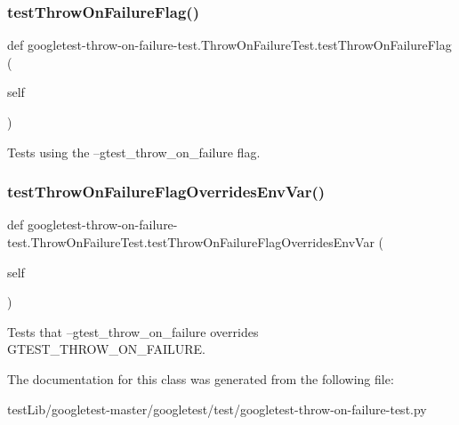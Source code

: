 \subsubsection{\texorpdfstring{test\+Throw\+On\+Failure\+Flag()}{testThrowOnFailureFlag()}}
{\footnotesize\ttfamily def googletest-\/throw-\/on-\/failure-\/test.\+Throw\+On\+Failure\+Test.\+test\+Throw\+On\+Failure\+Flag (\begin{DoxyParamCaption}\item[{}]{self }\end{DoxyParamCaption})}

\begin{DoxyVerb}Tests using the --gtest_throw_on_failure flag.\end{DoxyVerb}
 \mbox{\label{classgoogletest-throw-on-failure-test_1_1ThrowOnFailureTest_a18515553dbfe7b3e6ed6449fa81893c1}} 
\subsubsection{\texorpdfstring{test\+Throw\+On\+Failure\+Flag\+Overrides\+Env\+Var()}{testThrowOnFailureFlagOverridesEnvVar()}}
{\footnotesize\ttfamily def googletest-\/throw-\/on-\/failure-\/test.\+Throw\+On\+Failure\+Test.\+test\+Throw\+On\+Failure\+Flag\+Overrides\+Env\+Var (\begin{DoxyParamCaption}\item[{}]{self }\end{DoxyParamCaption})}

\begin{DoxyVerb}Tests that --gtest_throw_on_failure overrides GTEST_THROW_ON_FAILURE.\end{DoxyVerb}
 

The documentation for this class was generated from the following file\+:\begin{DoxyCompactItemize}
\item 
test\+Lib/googletest-\/master/googletest/test/googletest-\/throw-\/on-\/failure-\/test.\+py\end{DoxyCompactItemize}
